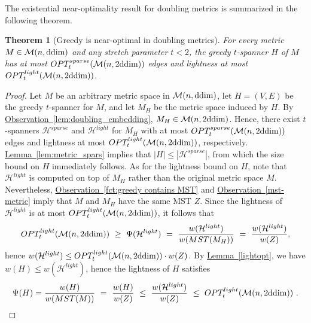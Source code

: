 \documentclass[11pt,letterpaper]{article}
\newtheorem{theorem}{Theorem}
\newcommand{\ddim}{{\rm ddim}}
\newcommand{\namedref}[2]{\hyperref[#2]{#1~\ref*{#2}}}
\newcommand{\lemmaref}[1]{\namedref{Lemma}{#1}}
\newcommand{\observationref}[1]{\namedref{Observation}{#1}}
\begin{document}
The existential near-optimality result for doubling metrics is summarized in the following theorem.
\begin{theorem}[Greedy is near-optimal in doubling metrics]\label{theorem:doubling_light}
	For every metric $M \in\mathcal{M}(n,\ddim)$ and any stretch parameter $t < 2$, the greedy $t$-spanner $H$ of $M$
	has at most $OPT^{sparse}_t(\mathcal{M}(n,2\ddim))$ edges and lightness at most $OPT^{light}_t(\mathcal{M}(n,2\ddim))$.
\end{theorem}
\begin{proof}
	Let $M$ be an arbitrary metric space in $\mathcal{M}(n,\ddim)$, let $H=\left(V,E\right)$ be
	the greedy $t$-spanner for $M$,	and let $M_H$ be the metric space induced by $H$.	
	By \observationref{lem:doubling_embedding}, $M_H \in \mathcal{M}(n,2\ddim)$.
	Hence, there exist $t$-spanners $\mathcal{H}^{sparse}$ and $\mathcal{H}^{light}$ for $M_H$ with at most $OPT^{sparse}_t(\mathcal{M}(n,2\ddim))$
	edges and lightness at most $OPT^{light}_t(\mathcal{M}(n,2\ddim))$, respectively.
	\lemmaref{lem:metric_spars} implies that  $|H|\le |\mathcal H^{sparse}|$, from which the size bound on $H$ immediately follows.
	As for the lightness bound on $H$, note that $\mathcal{H}^{light}$ is computed on top of $M_H$ rather than the original metric space $M$.
	Nevertheless, \observationref{fct:greedy contains MST} and \observationref{mst-metric} imply that $M$ and $M_H$ have the same MST $Z$.
	Since the lightness of $\mathcal{H}^{light}$ is at most $OPT^{light}_t(\mathcal{M}(n,2\ddim))$, it follows that
	$$OPT^{light}_t(\mathcal{M}(n,2\ddim)) ~\ge~ \Psi(\mathcal{H}^{light}) ~=~ \frac{w(\mathcal{H}^{light})}{w(MST(M_H))} ~=~ \frac{w(\mathcal{H}^{light})}{w(Z)},$$
	hence $w(\mathcal{H}^{light}) \le OPT^{light}_t(\mathcal{M}(n,2\ddim)) \cdot w(Z)$.
	By \lemmaref{lightopt}, we have $w(H) \le w(\mathcal {H}^{light})$, hence the lightness of $H$ satisfies
	\begin{eqnarray*} \Psi(H)  = \frac{w(H)}{w(MST(M))} ~=~ \frac{w(H)}{w(Z)} ~\le~ \frac{w(\mathcal{H}^{light})}{w(Z)}
		~\le~ OPT^{light}_t(\mathcal{M}(n,2\ddim))~.
	\end{eqnarray*}
\end{proof}
\end{document}
